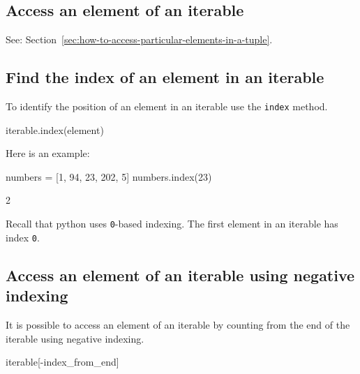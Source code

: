 \begin{raw}
[1, 6, 10, 20, 50, 50, 105]
\end{raw}





\subsection{Access an element of an iterable}
\label{\detokenize{building-tools/02-functions-and-data-structures/how/main:access-an-element-of-an-iterable}}

See: Section~\ref{sec:how-to-access-particular-elements-in-a-tuple}.


\subsection{Find the index of an element in an iterable}

To identify the position of an element in an iterable use the \texttt{index} method.


\begin{pyin}
iterable.index(element)
\end{pyin}



Here is an example:




\begin{pyin}
numbers = [1, 94, 23, 202, 5]
numbers.index(23)
\end{pyin}





\begin{raw}
2
\end{raw}


\begin{note}
Recall that python uses \texttt{0}-based indexing. The first element in an iterable has
index \texttt{0}.
\end{note}



\subsection{Access an element of an iterable using negative indexing}

It is possible to access an element of an iterable by counting from the end of
the iterable using negative indexing.


\begin{pyin}
iterable[-index_from_end]
\end{pyin}



